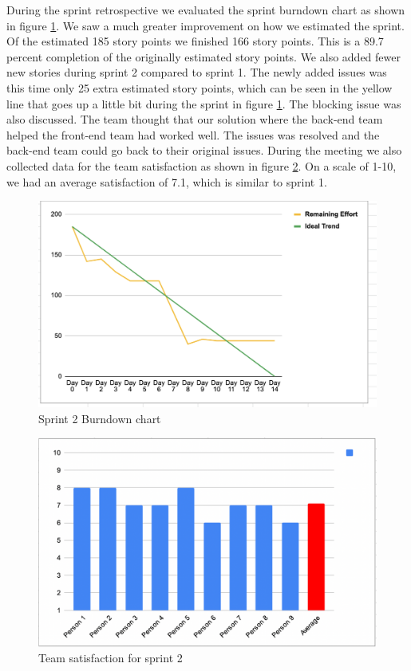 \documentclass{article}
\begin{document}
During the sprint retrospective we evaluated the sprint burndown chart as shown in figure \ref{fig:Burndown1}. We saw a much greater improvement on how we estimated the sprint. Of the estimated 185 story points we finished 166 story points. This is a 89.7 percent completion of the originally estimated story points. We also added fewer new stories during sprint 2 compared to sprint 1. The newly added issues was this time only 25 extra estimated story points, which can be seen in the yellow line that goes up a little bit during the sprint in figure \ref{fig:Burndown1}. The blocking issue was also discussed. The team thought that our solution where the back-end team helped the front-end team had worked well. The issues was resolved and the back-end team could go back to their original issues. During the meeting we also collected data for the team satisfaction as shown in figure \ref{fig:Satisfaction2}. On a scale of 1-10, we had an average satisfaction of 7.1, which is similar to sprint 1.

\begin{figure}[h!]
    \centering
    \includegraphics[scale=0.6]{pfrFigures/Sprint2.png}
    \caption{Sprint 2 Burndown chart}
    \label{fig:Burndown1}
\end{figure}

\begin{figure}[h!]
    \centering
    \includegraphics[scale=0.6]{pfrFigures/TeamSatisfaction2.png}
    \caption{Team satisfaction for sprint 2}
    \label{fig:Satisfaction2}
\end{figure}
\end{document}
